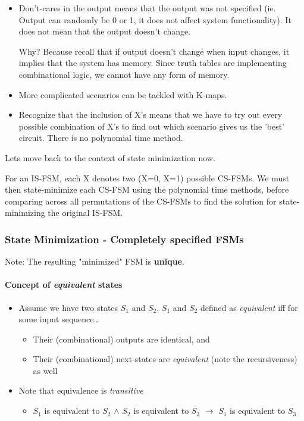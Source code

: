 \documentclass{article}
\begin{document}
\begin{itemize}
    \item 
        Don't-cares in the output means that the output was not specified (ie. Output can randomly be 0 or 1, it does not affect system functionality).
        It does not mean that the output doesn't change. 

        Why?
        Because recall that if output doesn't change when input changes, it implies that the system has memory.
        Since truth tables are implementing combinational logic, we cannot have any form of memory.
    \item 
        More complicated scenarios can be tackled with K-maps.

    \item 
        Recognize that the inclusion of X's means that we have to try out every possible combination of X's
        to find out which scenario gives us the 'best' circuit. There is no polynomial time method.
\end{itemize}

\vspace{0.1cm}
Lets move back to the context of state minimization now.

For an IS-FSM, each X denotes two (X=0, X=1) possible CS-FSMs.
We must then state-minimize each CS-FSM using the polynomial time methods, before comparing
across all permutations of the CS-FSMs to find the solution for state-minimizing the original IS-FSM.

\subsubsection{State Minimization - Completely specified FSMs}
Note: The resulting "minimized" FSM is \textbf{unique}.

\paragraph{Concept of \textit{equivalent} states}
\begin{itemize}
    \item Assume we have two states $S_{1}$ and $S_{2}$. $S_{1}$ and $S_{2}$ defined as \textit{equivalent} iff for some input sequence\dots
        \begin{itemize}
            \item Their (combinational) outputs are identical, and
            \item Their (combinational) next-states are \textit{equivalent} (note the recursiveness) as well
        \end{itemize}
    \item Note that equivalence is \textit{transitive}
        \begin{itemize}
            \item $S_{1}$ is equivalent to $S_{2}$ $\wedge$ $S_{2}$ is equivalent to $S_{3}$ $\longrightarrow$  $S_{1}$ is equivalent to $S_{3}$
        \end{itemize}
\end{itemize}
\end{document}
